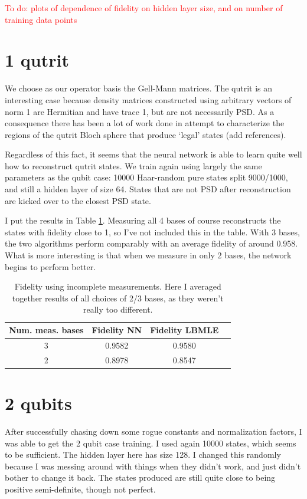 \documentclass[a4paper,10pt]{article}
\begin{document}
\textcolor{red}{To do: plots of dependence of fidelity on hidden layer size, and on number of training data points}

\section{1 qutrit}

We choose as our operator basis the Gell-Mann matrices. The qutrit is an interesting case because density matrices constructed using arbitrary vectors of norm 1 are Hermitian and have trace 1, but are not necessarily PSD. As a consequence there has been a lot of work done in attempt to characterize the regions of the qutrit Bloch sphere that produce `legal' states (add references).

Regardless of this fact, it seems that the neural network is able to learn quite well how to reconstruct qutrit states. We train again using largely the same parameters as the qubit case: 10000 Haar-random pure states split 9000/1000, and still a hidden layer of size 64. States that are not PSD after reconstruction are kicked over to the closest PSD state.

I put the results in Table \ref{tab:qutrit}. Measuring all 4 bases of course reconstructs the states with fidelity close to 1, so I've not included this in the table. With 3 bases, the two algorithms perform comparably with an average fidelity of around 0.958. What is more interesting is that when we measure in only 2 bases, the network begins to perform better.

\begin{table}[h!]
 \centering
 \begin{tabular}{|c||c|c|c|}
 \hline
  Num. meas. bases &  Fidelity NN & Fidelity LBMLE \\ \hline
  3 & 0.9582 &  0.9580 \\
  2 & 0.8978 & 0.8547  \\ \hline
 \end{tabular}
 \caption{Fidelity using incomplete measurements. Here I averaged together results of all choices of 2/3 bases, as they weren't really too different.}
 \label{tab:qutrit}
\end{table}

\section{2 qubits}

After successfully chasing down some rogue constants and normalization factors, I was able to get the 2 qubit case training. I used again 10000 states, which seems to be sufficient. The hidden layer here has size 128. I changed this randomly because I was messing around with things when they didn't work, and just didn't bother to change it back. The states produced are still quite close to being positive semi-definite, though not perfect.
\end{document}
